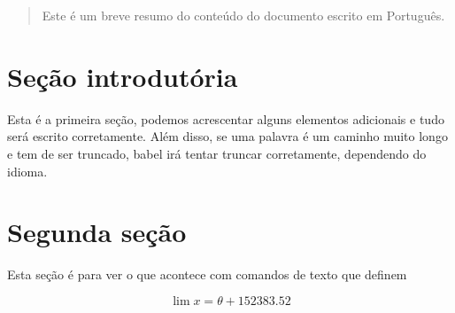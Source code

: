 \documentclass{article}
\begin{document}
\tableofcontents

\vspace{2cm} %

\begin{abstract}
Este é um breve resumo do conteúdo do documento escrito em Português.
\end{abstract}

\section{Seção introdutória}
Esta é a primeira seção, podemos acrescentar alguns elementos adicionais 
e tudo será escrito corretamente. Além disso, se uma palavra é um caminho 
muito longo e tem de ser truncado, babel irá tentar truncar corretamente, 
dependendo do idioma.

\section{Segunda seção}
Esta seção é para ver o que acontece com comandos de texto que definem

\[ \lim x =  \theta + 152383.52 \]
\end{document}
